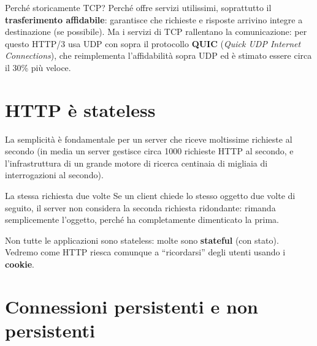 Perché storicamente TCP? Perché offre servizi utilissimi, soprattutto il \textbf{trasferimento
affidabile}: garantisce che richieste e risposte arrivino integre a destinazione (se possibile). Ma i
servizi di TCP rallentano la comunicazione: per questo HTTP/3 usa UDP con sopra il protocollo
\textbf{QUIC} (\emph{Quick UDP Internet Connections}), che reimplementa l'affidabilità sopra UDP ed è
stimato essere circa il 30\% più veloce.


\section{HTTP è stateless}

La semplicità è fondamentale per un server che riceve moltissime richieste al secondo (in media
un server gestisce circa 1000 richieste HTTP al secondo, e l'infrastruttura di un grande motore di
ricerca centinaia di migliaia di interrogazioni al secondo).


\begin{esempio}{La stessa richiesta due volte}
Se un client chiede lo stesso oggetto due volte di seguito, il server non considera la seconda
richiesta ridondante: rimanda semplicemente l'oggetto, perché ha completamente dimenticato la prima.
\end{esempio}

Non tutte le applicazioni sono stateless: molte sono \textbf{stateful} (con stato). Vedremo come HTTP
riesca comunque a ``ricordarsi'' degli utenti usando i \textbf{cookie}.

\section{Connessioni persistenti e non persistenti}

